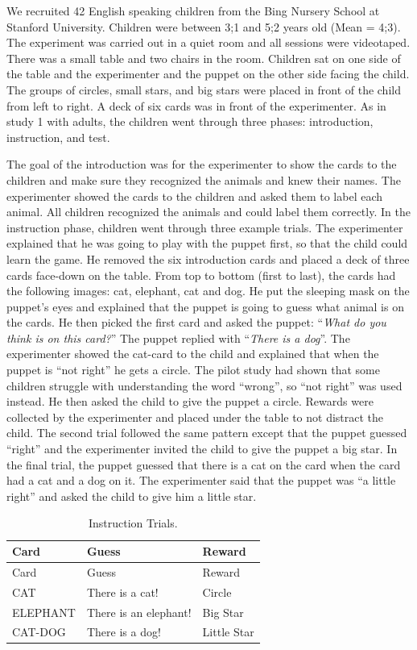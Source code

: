 \documentclass[floatsintext,man]{apa6}
\theoremstyle{definition}
\theoremstyle{definition}
\theoremstyle{definition}
\theoremstyle{remark}
\begin{document}
We recruited 42 English speaking children from the Bing Nursery School
at Stanford University. Children were between 3;1 and 5;2 years old
(Mean = 4;3). The experiment was carried out in a quiet room and all
sessions were videotaped. There was a small table and two chairs in the
room. Children sat on one side of the table and the experimenter and the
puppet on the other side facing the child. The groups of circles, small
stars, and big stars were placed in front of the child from left to
right. A deck of six cards was in front of the experimenter. As in study
1 with adults, the children went through three phases: introduction,
instruction, and test.

The goal of the introduction was for the experimenter to show the cards
to the children and make sure they recognized the animals and knew their
names. The experimenter showed the cards to the children and asked them
to label each animal. All children recognized the animals and could
label them correctly. In the instruction phase, children went through
three example trials. The experimenter explained that he was going to
play with the puppet first, so that the child could learn the game. He
removed the six introduction cards and placed a deck of three cards
face-down on the table. From top to bottom (first to last), the cards
had the following images: cat, elephant, cat and dog. He put the
sleeping mask on the puppet's eyes and explained that the puppet is
going to guess what animal is on the cards. He then picked the first
card and asked the puppet: \enquote{\emph{What do you think is on this
card?}} The puppet replied with \enquote{\emph{There is a dog}}. The
experimenter showed the cat-card to the child and explained that when
the puppet is \enquote{not right} he gets a circle. The pilot study had
shown that some children struggle with understanding the word
\enquote{wrong}, so \enquote{not right} was used instead. He then asked
the child to give the puppet a circle. Rewards were collected by the
experimenter and placed under the table to not distract the child. The
second trial followed the same pattern except that the puppet guessed
\enquote{right} and the experimenter invited the child to give the
puppet a big star. In the final trial, the puppet guessed that there is
a cat on the card when the card had a cat and a dog on it. The
experimenter said that the puppet was \enquote{a little right} and asked
the child to give him a little star.

\begin{longtable}[]{@{}lll@{}}
\caption{\label{tab:instruction} Instruction Trials.}\tabularnewline
\toprule
Card & Guess & Reward\tabularnewline
\midrule
\endfirsthead
\toprule
Card & Guess & Reward\tabularnewline
\midrule
\endhead
CAT & There is a cat! & Circle\tabularnewline
ELEPHANT & There is an elephant! & Big Star\tabularnewline
CAT-DOG & There is a dog! & Little Star\tabularnewline
\bottomrule
\end{longtable}
\end{document}
